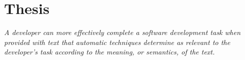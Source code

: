 

\section{Thesis}
\label{cp1:thesis}


\smallskip
\begin{bluequote}
    \textit{
        A developer can more effectively complete a software development task when provided
        with text that automatic techniques determine as relevant to the developer's task
        according to the meaning, or semantics, of the text.
    }
\end{bluequote}

